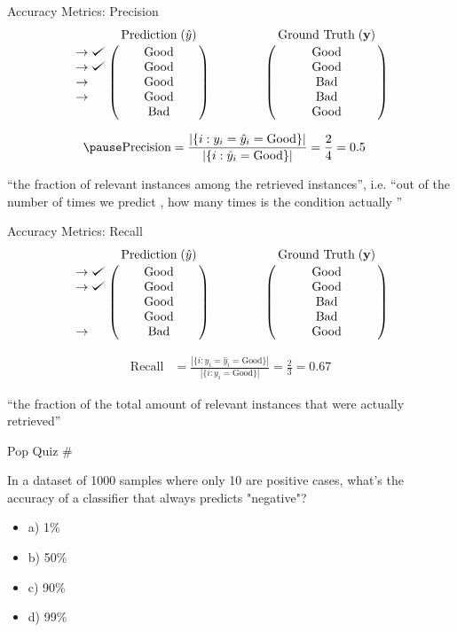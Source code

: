 \documentclass[usenames,dvipsnames]{beamer}
\begin{document}
\begin{frame}{Accuracy Metrics: Precision}
$$
\bordermatrix{&\text{Prediction}\;(\hat{y})\cr
               \rightarrow\checkmark&\text{Good}\cr
               \rightarrow\checkmark&\text{Good}\cr
                \rightarrow&\text{Good}\cr
                \rightarrow&\text{Good}\cr
               &\text{Bad}}
\qquad \qquad
\bordermatrix{&\text{Ground Truth}\;(\vy)\cr
                &\text{Good}\cr
                &\text{Good}\cr
                &\text{Bad}\cr
                &\text{Bad}\cr
                &\text{Good}}
$$

\begin{align*}
\pause \text{Precision} &= \frac{|\{i : y_i = \hat{y}_i = \text{Good}\}|}{|\{i : \hat{y}_i = \text{Good}\}|} = \frac{2}{4} = 0.5
\end{align*}

``the fraction of relevant instances among the retrieved instances'', i.e. ``out of the number of times we predict , how many times is the condition actually ''

\end{frame}

\begin{frame}{Accuracy Metrics: Recall}
$$
\bordermatrix{&\text{Prediction}\;(\hat{y})\cr
               \rightarrow\checkmark&\text{Good}\cr
               \rightarrow\checkmark&\text{Good}\cr
                &\text{Good}\cr
                &\text{Good}\cr
               \rightarrow&\text{Bad}}
\qquad \qquad
\bordermatrix{&\text{Ground Truth}\;(\vy)\cr
                &\text{Good}\cr
                &\text{Good}\cr
                &\text{Bad}\cr
                &\text{Bad}\cr
                &\text{Good}}
$$

\begin{align*}
\text{Recall} &= \frac{|\{i : y_i = \hat{y}_i = \text{Good}\}|}{|\{i : y_i = \text{Good}\}|} = \frac{2}{3} = 0.67
\end{align*}

``the fraction of the total amount of relevant instances that were actually retrieved''

\end{frame}

\begin{frame}{Pop Quiz \#\thepopquiz}
\begin{popquizbox}{\thepopquiz}
In a dataset of 1000 samples where only 10 are positive cases, what's the accuracy of a classifier that always predicts "negative"?
\begin{itemize}
	\item a) 1\%
	\item b) 50\% 
	\item c) 90\%
	\item d) 99\%
\end{itemize}
\end{popquizbox}
\end{frame}
\end{document}

